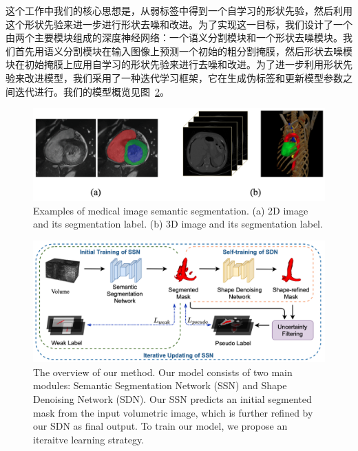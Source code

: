 这个工作中我们的核心思想是，从弱标签中得到一个自学习的形状先验，然后利用这个形状先验来进一步进行形状去噪和改进。为了实现这一目标，我们设计了一个由两个主要模块组成的深度神经网络：一个语义分割模块和一个形状去噪模块。我们首先用语义分割模块在输入图像上预测一个初始的粗分割掩膜，然后形状去噪模块在初始掩膜上应用自学习的形状先验来进行去噪和改进。为了进一步利用形状先验来改进模型，我们采用了一种迭代学习框架，它在生成伪标签和更新模型参数之间迭代进行。我们的模型概览见图~\ref{fig:model}。


    \begin{figure}[tbp]
        \centering 
        \includegraphics[width=1.0\textwidth]{img/c3/c3_1.png}
        {Examples of medical image semantic segmentation. (a) 2D image and its segmentation label. (b) 3D image and its segmentation label.}
        \label{c3_fig1}
    \end{figure}

    \begin{figure}[t!]
        \centering 
        \includegraphics[width=1.00\textwidth]{img/c3/b_model_shape.png}
        {The overview of our method. Our model consists of two main modules: Semantic Segmentation Network (SSN) and Shape Denoising Network (SDN). Our SSN predicts an initial segmented mask from the input volumetric image, which is further refined by our SDN as final output. To train our model, we propose an iteraitve learning strategy.}
        \label{fig:model}
    \end{figure}


